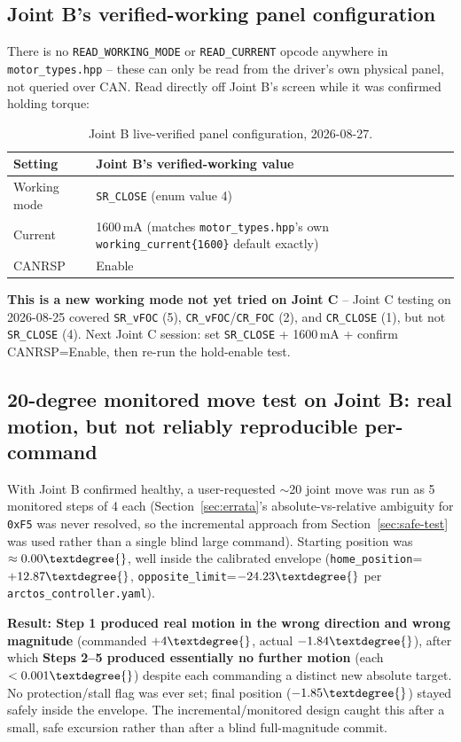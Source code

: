 \documentclass[11pt,letterpaper]{article}
\begin{document}
\subsection{Joint B's verified-working panel configuration}
There is no \texttt{READ\_WORKING\_MODE} or \texttt{READ\_CURRENT} opcode anywhere in \texttt{motor\_types.hpp} -- these can only be read from the driver's own physical panel, not queried over CAN. Read directly off Joint B's screen while it was confirmed holding torque:
\begin{table}[h]
\centering
\begin{tabular}{ll}
\toprule
\textbf{Setting} & \textbf{Joint B's verified-working value} \\ \midrule
Working mode & \texttt{SR\_CLOSE} (enum value 4) \\
Current & 1600\,mA (matches \texttt{motor\_types.hpp}'s own \texttt{working\_current\{1600\}} default exactly) \\
CANRSP & Enable \\ \bottomrule
\end{tabular}
\caption{Joint B live-verified panel configuration, 2026-08-27.}
\end{table}
\textbf{This is a new working mode not yet tried on Joint C} -- Joint C testing on 2026-08-25 covered \texttt{SR\_vFOC} (5), \texttt{CR\_vFOC}/\texttt{CR\_FOC} (2), and \texttt{CR\_CLOSE} (1), but not \texttt{SR\_CLOSE} (4). Next Joint C session: set \texttt{SR\_CLOSE} + 1600\,mA + confirm CANRSP=Enable, then re-run the hold-enable test.

\subsection{20-degree monitored move test on Joint B: real motion, but not reliably reproducible per-command}
With Joint B confirmed healthy, a user-requested $\sim$20\textdegree{} joint move was run as 5 monitored steps of 4\textdegree{} each (Section~\ref{sec:errata}'s absolute-vs-relative ambiguity for \texttt{0xF5} was never resolved, so the incremental approach from Section~\ref{sec:safe-test} was used rather than a single blind large command). Starting position was $\approx 0.00\textdegree{}$, well inside the calibrated envelope (\texttt{home\_position}=$+12.87\textdegree{}$, \texttt{opposite\_limit}=$-24.23\textdegree{}$ per \texttt{arctos\_controller.yaml}).

\textbf{Result: Step 1 produced real motion in the wrong direction and wrong magnitude} (commanded $+4\textdegree{}$, actual $-1.84\textdegree{}$), after which \textbf{Steps 2--5 produced essentially no further motion} (each $<0.001\textdegree{}$) despite each commanding a distinct new absolute target. No protection/stall flag was ever set; final position ($-1.85\textdegree{}$) stayed safely inside the envelope. The incremental/monitored design caught this after a small, safe excursion rather than after a blind full-magnitude commit.
\end{document}
